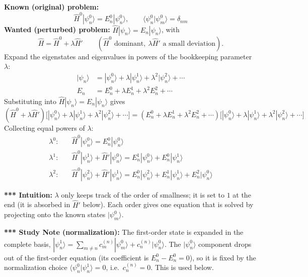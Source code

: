 \documentclass[11pt,a4paper]{article}
\begin{document}
\textbf{Known (original) problem:}
\[
\hat H^0 |\psi_n^0\rangle = E_n^0 |\psi_n^0\rangle, \qquad \langle \psi_n^0 | \psi_m^0 \rangle = \delta_{nm}
\]
\textbf{Wanted (perturbed) problem:} $\hat H|\psi_n\rangle = E_n |\psi_n\rangle$, with
\[
\hat H = \hat H^0 + \lambda \hat H' \qquad (\hat H^0 \text{ dominant},\ \lambda\hat H' \text{ a small deviation}).
\]
Expand the eigenstates and eigenvalues in powers of the bookkeeping parameter $\lambda$:
\begin{align*}
|\psi_n\rangle &= |\psi_n^0\rangle + \lambda|\psi_n^1\rangle + \lambda^2|\psi_n^2\rangle + \cdots \\
E_n &= E_n^0 + \lambda E_n^1 + \lambda^2 E_n^2 + \cdots
\end{align*}
Substituting into $\hat H|\psi_n\rangle = E_n|\psi_n\rangle$ gives
\[
(\hat H^0 + \lambda\hat H')\big[|\psi_n^0\rangle + \lambda|\psi_n^1\rangle + \lambda^2|\psi_n^2\rangle + \cdots\big] = (E_n^0 + \lambda E_n^1 + \lambda^2 E_n^2 + \cdots)\big[|\psi_n^0\rangle + \lambda|\psi_n^1\rangle + \lambda^2|\psi_n^2\rangle + \cdots\big]
\]
Collecting equal powers of $\lambda$:
\begin{align*}
\lambda^0:\quad & \hat H^0|\psi_n^0\rangle = E_n^0|\psi_n^0\rangle \\
\lambda^1:\quad & \hat H^0|\psi_n^1\rangle + \hat H'|\psi_n^0\rangle = E_n^1|\psi_n^0\rangle + E_n^0|\psi_n^1\rangle \\
\lambda^2:\quad & \hat H^0|\psi_n^2\rangle + \hat H'|\psi_n^1\rangle = E_n^0|\psi_n^2\rangle + E_n^1|\psi_n^1\rangle + E_n^2|\psi_n^0\rangle
\end{align*}

\textbf{*** Intuition:} $\lambda$ only keeps track of the order of smallness; it is set to $1$ at the end (it is absorbed in $\hat H'$ below). Each order gives one equation that is solved by projecting onto the known states $|\psi_m^0\rangle$.

\textbf{*** Study Note (normalization):} The first-order state is expanded in the complete basis, $|\psi_n^1\rangle = \sum_{m\ne n} c_m^{(n)}|\psi_m^0\rangle + c_n^{(n)}|\psi_n^0\rangle$. The $|\psi_n^0\rangle$ component drops out of the first-order equation (its coefficient is $E_n^0-E_n^0=0$), so it is fixed by the normalization choice $\langle\psi_n^0|\psi_n^1\rangle=0$, i.e.\ $c_n^{(n)}=0$. This is used below.
\end{document}
